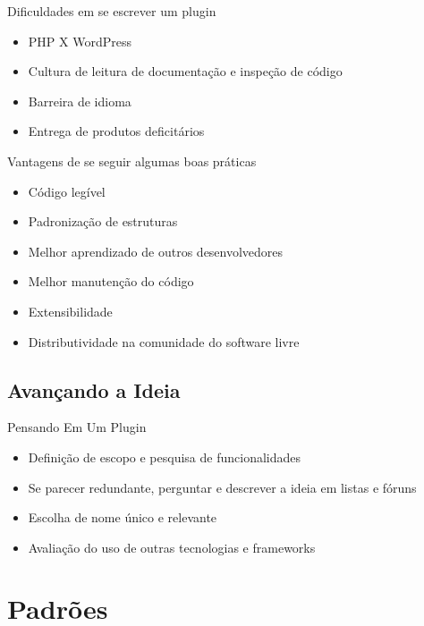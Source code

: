 \documentclass{beamer}
\begin{document}
\begin{frame}{Dificuldades em se escrever um plugin}
\begin{itemize}
  \pause \item PHP X WordPress
  \pause \item Cultura de leitura de documentação e inspeção de código
  \pause \item Barreira de idioma
  \pause \item Entrega de produtos deficitários
\end{itemize}
\end{frame}

\begin{frame}{Vantagens de se seguir algumas boas práticas}
\begin{itemize}
  \pause \item Código legível
  \pause \item Padronização de estruturas
  \pause \item Melhor aprendizado de outros desenvolvedores
  \pause \item Melhor manutenção do código
  \pause \item Extensibilidade
  \pause \item Distributividade na comunidade do software livre
\end{itemize}
\end{frame}

\subsection{Avançando a Ideia}

\begin{frame}{Pensando Em Um Plugin}
\begin{itemize}
  \pause \item Definição de escopo e pesquisa de funcionalidades
  \pause \item Se parecer redundante, perguntar e descrever a
    ideia em listas e fóruns
  \pause \item Escolha de nome único e relevante
  \pause \item Avaliação do uso de outras tecnologias e frameworks
\end{itemize}
\end{frame}

\section{Padrões}
\end{document}
